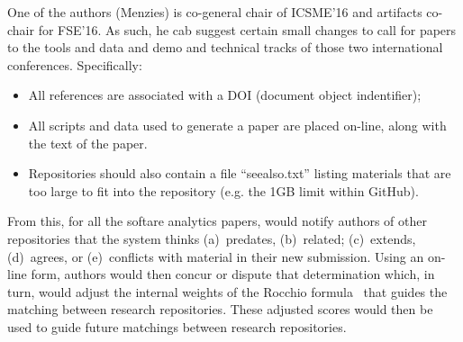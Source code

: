 \documentclass[journal]{IEEEtran}
\newcommand{\bi}{\begin{itemize}}
\newcommand{\ei}{\end{itemize}}
\begin{document}
One of the authors (Menzies) is  co-general chair of ICSME'16 and artifacts co-chair for FSE'16.
As such, he cab  suggest certain small changes to call for papers to the tools and data and demo and technical tracks of those two international conferences. Specifically:
\bi
\item All references are associated with a DOI (document object indentifier);
\item All scripts and data used to generate a paper are placed on-line, along with the
text of the paper.
\item  Repositories should also contain  a file ``seealso.txt'' listing materials
that are too large to fit into the repository (e.g. the 1GB limit
within GitHub). 
\ei
From this, for all the softare analytics papers, {\IT} would  notify authors of  other repositories that the system thinks   (a)~predates, (b)~related; (c)~extends, (d)~agrees, or (e)~conflicts with material in their  new submission.
Using an on-line form,
authors would then concur or dispute that determination which, in turn, would adjust the internal weights of the Rocchio formula~\cite{rocc71} that guides the matching between research repositories. These adjusted scores would then be used to guide future matchings between research repositories.
\end{document}
